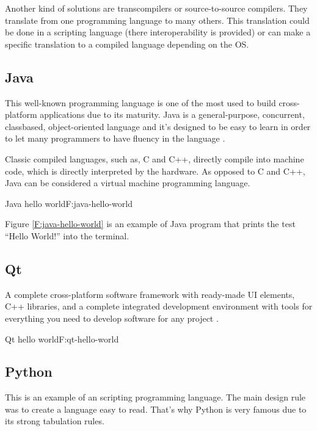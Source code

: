 Another kind of solutions are transcompilers or source-to-source compilers. They
translate from one programming language to many others. This translation could
be done in a scripting language (there interoperability is provided) or can make
a specific translation to a compiled language depending on the OS.

\subsection{Java}

This well-known programming language is one of the most used to build
cross-platform applications due to its maturity. Java is a general-purpose,
concurrent, classbased, object-oriented language and it's designed to be easy
to learn in order to let many programmers to have fluency in the language
\cite{java-8-specs}.

Classic compiled languages, such as, C and C++, directly compile into machine
code, which is directly interpreted by the hardware. As opposed to C and C++,
Java can be considered a virtual machine programming language.

\begin{codefigure}{Java hello world}{F:java-hello-world}
\end{codefigure}

Figure \ref{F:java-hello-world} is an example of Java program that prints the
test “Hello World!” into the terminal.

\subsection{Qt}

A complete cross-platform software framework with ready-made UI elements, C++ 
libraries, and a complete integrated development environment with tools for 
everything you need to develop software for any project \cite{qt-web}.

\begin{codefigure}{Qt hello world}{F:qt-hello-world}
\end{codefigure}

\subsection{Python}

This is an example of an scripting programming language. The main design rule
was to create a language easy to read. That's why Python is very famous due to
its strong tabulation rules.

